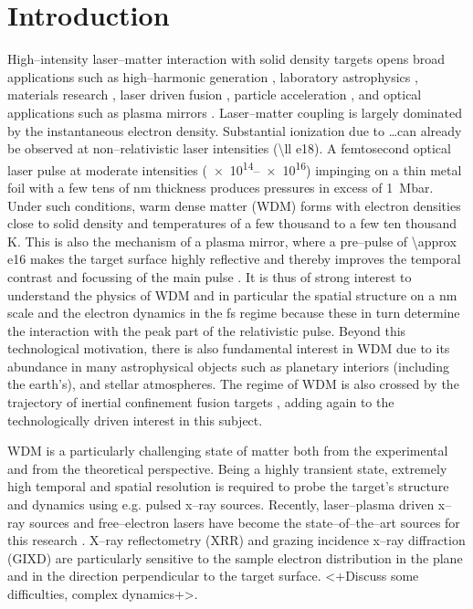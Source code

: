 \documentclass[preprint, 12pt]{elsarticle}
\begin{document}
\section{Introduction}
\label{S:1}

High--intensity laser--matter interaction with solid density targets opens
broad applications such as high--harmonic generation \cite{}, laboratory
astrophysics \cite{}, materials research \cite{}, laser driven fusion
\cite{}, particle acceleration \cite{}, and optical applications such as plasma
mirrors \cite{}.
Laser--matter coupling is largely dominated by the instantaneous electron density.
Substantial ionization due to \ldots can already be observed at
non--relativistic laser intensities (\SI{\ll
e18}{\Wsqcm}). A femtosecond optical laser pulse at moderate intensities
(\SIrange{e14}{e16}{\Wsqcm}) impinging on a thin
metal foil with a few tens of \si{\nm} thickness produces pressures in excess of
\SI{1}{\mega\bar}. Under such conditions, warm dense matter (WDM) forms
with electron densities close to solid density and temperatures of a few
thousand to a few ten thousand \si{\K}. This is also the mechanism of a plasma
mirror, where a pre--pulse of  \SI{\approx e16}{\Wsqcm} makes the target surface
highly reflective and thereby improves the temporal contrast and focussing of
the main pulse .
It is thus of strong interest to understand
the physics of WDM and in particular the spatial structure on a \si{\nm} scale
and the electron dynamics in the \si{\fs} regime
because these in turn determine the interaction with the peak
part of the relativistic pulse.
Beyond this technological motivation, there is also fundamental interest in WDM
due to its abundance in many astrophysical objects \cite{Nettelmann2008a}
such as planetary
interiors (including the earth's), and stellar atmospheres. The regime of WDM
is also crossed by the trajectory of inertial confinement fusion targets \cite{Lindl2004}, adding
again to the technologically driven interest in this subject.

WDM is a particularly challenging state of matter both from the experimental and from the
theoretical perspective. Being a highly transient state, extremely high temporal
and spatial resolution is required to probe the target's structure and dynamics
using e.g. pulsed x--ray sources. Recently, laser--plasma driven x--ray sources
and free--electron lasers have become the state--of--the--art sources for this
research \cite{Lee2003, Lee2003a}.
X--ray reflectometry (XRR) and grazing incidence x--ray diffraction (GIXD) \cite{TBC} are particularly
sensitive to the sample electron distribution in the plane and in the direction
perpendicular to the target surface.
<+Discuss some difficulties, complex
dynamics+>.
\end{document}
